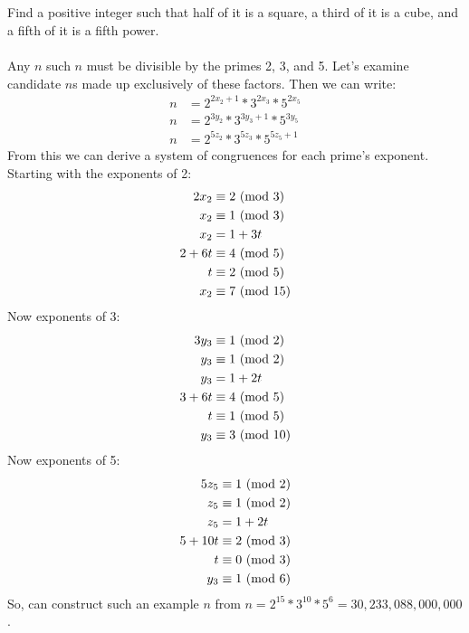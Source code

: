 \documentclass{article}
\begin{document}
\subsection{}
Find a positive integer such that half of it is a square, a third of it
is a cube, and a fifth of it is a fifth power.\\~\\
Any $n$ such $n$ must be divisible by the primes 2, 3, and 5.
Let's examine candidate $n$s made up exclusively of these factors.
Then we can write:
\begin{align*}
    n &= 2^{2x_2 + 1} * 3^{2x_3} * 5^{2x_5}\\
    n &= 2^{3y_2} * 3^{3y_3 + 1} * 5^{3y_5}\\
    n &= 2^{5z_2} * 3^{5z_3} * 5^{5z_5 + 1}
\end{align*}
From this we can derive a system of congruences for each prime's exponent.
Starting with the exponents of 2:
\begin{align*}
    2x_2 &\equiv 2 \ (\mathrm{mod}\ 3)\\
    x_2 &\equiv 1 \ (\mathrm{mod}\ 3)\\
    x_2 &= 1 + 3t\\
    2 + 6t &\equiv 4 \ (\mathrm{mod}\ 5)\\
    t &\equiv 2 \ (\mathrm{mod}\ 5)\\
    x_2 &\equiv 7 \ (\mathrm{mod}\ 15)
\end{align*}
Now exponents of 3:
\begin{align*}
    3y_3 &\equiv 1 \ (\mathrm{mod}\ 2)\\
    y_3 &\equiv 1 \ (\mathrm{mod}\ 2)\\
    y_3 &= 1 + 2t\\
    3 + 6t &\equiv 4 \ (\mathrm{mod}\ 5)\\
    t &\equiv 1 \ (\mathrm{mod}\ 5)\\
    y_3 &\equiv 3 \ (\mathrm{mod}\ 10)
\end{align*}
Now exponents of 5:
\begin{align*}
    5z_5 &\equiv 1 \ (\mathrm{mod}\ 2)\\
    z_5 &\equiv 1 \ (\mathrm{mod}\ 2)\\
    z_5 &= 1 + 2t\\
    5 + 10t &\equiv 2 \ (\mathrm{mod}\ 3)\\
    t &\equiv 0 \ (\mathrm{mod}\ 3)\\
    y_3 &\equiv 1 \ (\mathrm{mod}\ 6)
\end{align*}
So, can construct such an example $n$ from
$n = 2^{15} * 3^{10} * 5^{6} = 30,233,088,000,000$.

\end{document}

